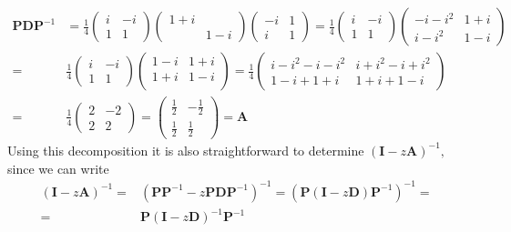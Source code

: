 \documentclass[10pt,a4paper]{article}
\newcommand{\half}[0]{\frac{1}{2}}
\newcommand{\bvec}[1]{\mathbf{#1}}
\begin{document}
\begin{align*}
  \bvec{P}\bvec{D}\bvec{P}^{-1} &=
  \frac{1}{4} \begin{pmatrix}
    i & -i \\
    1 &  1
  \end{pmatrix}
  \begin{pmatrix}
    1 + i & \\
    & 1 - i
  \end{pmatrix}
  \begin{pmatrix}
    -i & 1 \\
    i &  1
  \end{pmatrix} = \frac{1}{4}
  \begin{pmatrix}
    i & -i \\
    1 & 1
  \end{pmatrix}
  \begin{pmatrix}
    -i - i^2 & 1 + i \\
    i - i^2 & 1 - i
  \end{pmatrix} \\
  =& \frac{1}{4}
  \begin{pmatrix}
    i & -i \\
    1 &  1
  \end{pmatrix}
  \begin{pmatrix}
   1 - i & 1 + i \\
   1 + i & 1 - i \\
  \end{pmatrix} = \frac{1}{4}
  \begin{pmatrix}
    i - i^2 - i - i^2 & i + i^2 -i + i^2 \\
    1 - i + 1 + i & 1 + i + 1 - i
  \end{pmatrix} \\
  =& \frac{1}{4}\begin{pmatrix}
    2 & -2 \\
    2 & 2
  \end{pmatrix} =
  \begin{pmatrix}
    \half & -\half \\
    \half & \half
  \end{pmatrix} = \bvec{A}
\end{align*}
Using this decomposition it is also straightforward to determine $(\bvec{I}-z\bvec{A})^{-1},$ since we can write
\begin{align*}
  (\bvec{I} - z\bvec{A})^{-1} =&   (\bvec{P}\bvec{P}^{-1} - z\bvec{P}\bvec{D}\bvec{P}^{-1})^{-1} = \left(\bvec{P}\left(\bvec{I} - z\bvec{D}\right)\bvec{P}^{-1}\right)^{-1} = \\
  =& \bvec{P}\left(\bvec{I} - z\bvec{D}\right)^{-1}\bvec{P}^{-1}
\end{align*}
\end{document}
